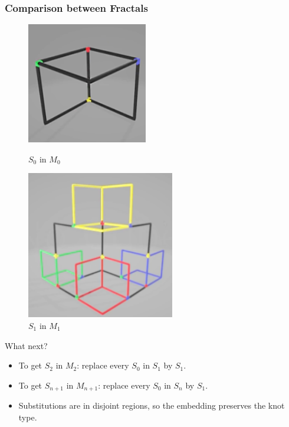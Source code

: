 \begin{frame}
	\frametitle{Comparison between Fractals} %
	\begin{figure}[!htb]
		\begin{minipage}{0.48\textwidth}
			\centering
			\includegraphics[width=0.42\linewidth]{images/Comparison1}
			\caption{$S_0$ in $M_0$}\label{Fig:Data1}
		\end{minipage}\hfill
		\begin{minipage}{0.48\textwidth}
			\centering
			\includegraphics[width=0.42\linewidth]{images/Comparison2}
			\caption{$S_1$ in $M_1$}\label{Fig:Data2}
		\end{minipage}
	\end{figure}
	What next?
	\onslide<3->
	\begin{itemize}
		\item To get $S_2$ in $M_2$: replace every $S_0$ in $S_1$ by $S_1.$
		\onslide<4->
		\item To get $S_{n+1}$ in $M_{n+1}$: replace every $S_0$ in $S_n$ by $S_1.$
		\onslide<5->
		\item Substitutions are in disjoint regions, so the embedding preserves the knot type.
	\end{itemize}
\end{frame}

